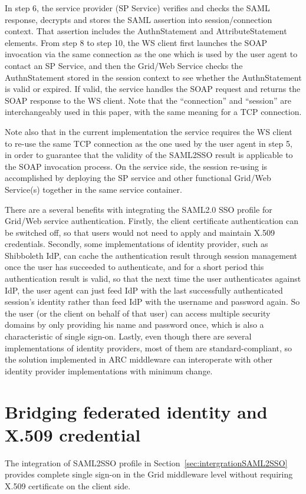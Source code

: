 \documentclass[conference]{IEEEtran}
\begin{document}
In step 6, the service provider (SP Service) verifies and checks the SAML
response, decrypts and stores the SAML assertion into session/connection context. That assertion includes the
AuthnStatement and AttributeStatement elements. From step 8 to step 10, the WS client first
launches the SOAP invocation via the same connection as the one which is used by the user agent to contact an SP
Service, and then the Grid/Web Service checks the AuthnStatement stored in the session context to see whether the
AuthnStatement is valid or expired. If valid, the service handles the SOAP request and returns the SOAP response to
the WS client. Note that the ``connection'' and ``session'' are interchangeably used in this paper, with
the same meaning for a TCP connection.

Note also that in the current implementation the service requires the WS client
to re-use the same TCP connection as the one used by the user agent in step 5, in order to
guarantee that the validity of the SAML2SSO result is applicable to the SOAP invocation process. On the service
side, the session re-using is accomplished by deploying the SP service and other
functional Grid/Web Service(s) together in the same service container.

There are a several benefits with integrating the SAML2.0 SSO profile for
Grid/Web service authentication. Firstly, the client certificate authentication can be switched off, so that
users would not need to apply and maintain X.509 credentials. Secondly, some implementations of
identity provider, such as Shibboleth IdP, can cache the authentication result through session management
once the user has succeeded to authenticate, and for a short period this authentication result
is valid, so that the next time the user authenticates against IdP, the user agent can just feed
IdP with the last successfully authenticated session's identity rather than feed IdP with
the username and password again. So the user (or the client on behalf of that user) can access multiple
security domains by only providing his name and password once, which is also a characteristic of
single sign-on. Lastly, even though there are several implementations of identity providers,
most of them are standard-compliant, so the solution implemented in ARC middleware can
interoperate with other identity provider implementations with minimum change.

\section{Bridging federated identity and X.509 credential}
\label{sec:fedidtoX509}
The integration of SAML2SSO profile in Section~\ref{sec:intergrationSAML2SSO}
provides complete single sign-on in the Grid middleware level without requiring X.509
certificate on the client side.
\end{document}
